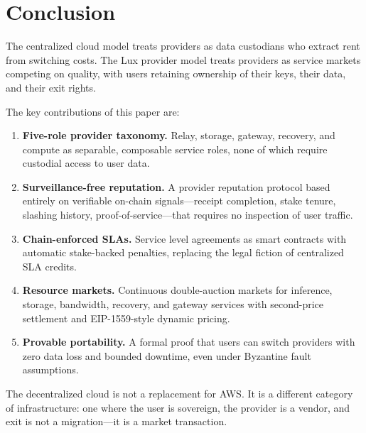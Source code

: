 \section{Conclusion}
\label{sec:conclusion}

The centralized cloud model treats providers as data custodians who
extract rent from switching costs. The Lux provider model treats
providers as service markets competing on quality, with users retaining
ownership of their keys, their data, and their exit rights.

The key contributions of this paper are:

\begin{enumerate}
    \item \textbf{Five-role provider taxonomy.} Relay, storage, gateway,
    recovery, and compute as separable, composable service roles, none of
    which require custodial access to user data.

    \item \textbf{Surveillance-free reputation.} A provider reputation
    protocol based entirely on verifiable on-chain signals---receipt
    completion, stake tenure, slashing history, proof-of-service---that
    requires no inspection of user traffic.

    \item \textbf{Chain-enforced SLAs.} Service level agreements as smart
    contracts with automatic stake-backed penalties, replacing the legal
    fiction of centralized SLA credits.

    \item \textbf{Resource markets.} Continuous double-auction markets
    for inference, storage, bandwidth, recovery, and gateway services
    with second-price settlement and EIP-1559-style dynamic pricing.

    \item \textbf{Provable portability.} A formal proof that users can
    switch providers with zero data loss and bounded downtime, even under
    Byzantine fault assumptions.
\end{enumerate}

The decentralized cloud is not a replacement for AWS. It is a different
category of infrastructure: one where the user is sovereign, the provider
is a vendor, and exit is not a migration---it is a market transaction.

